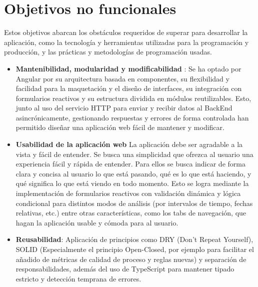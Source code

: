 \section{Objetivos no funcionales}

Estos objetivos abarcan los obstáculos requeridos de superar para desarrollar la aplicación, como la tecnología y herramientas utilizadas para la programación y producción, y las prácticas y metodologías de programación usadas.

\begin{itemize}
  \item \textbf{Mantenibilidad, modularidad y modificabilidad }: Se ha optado por Angular por su arquitectura basada en componentes, su flexibilidad y facilidad para la maquetación y el diseño de interfaces, su integración con formularios reactivos y su estructura dividida en módulos reutilizables. Esto, junto al uso del servicio HTTP para enviar y recibir datos al BackEnd asincrónicamente, gestionando respuestas y errores de forma controlada han permitido diseñar una aplicación web fácil de mantener y modificar.
  
  \item \textbf{Usabilidad de la aplicación web} La aplicación debe ser agradable a la vista y fácil de entender. Se busca una simplicidad que ofrezca al usuario una experiencia fácil y rápida de entender. Para ellos se busca indicar de forma clara y concisa al usuario lo que está pasando, qué es lo que está haciendo, y qué significa lo que está viendo en todo momento. Esto se logra mediante la implementación de formularios reactivos con validación dinámica y lógica condicional para distintos modos de análisis (por intervalos de tiempo, fechas relativas, etc.) entre otras características, como los tabs de navegación, que hagan la aplicación usable y cómoda para al usuario.

  \item \textbf{Reusabilidad}: Aplicación de principios como DRY (Don't Repeat Yourself), SOLID (Especialmente el principio Open-Closed, por ejemplo para facilitar el añadido de métricas de calidad de proceso y reglas nuevas) y separación de responsabilidades, además del uso de TypeScript para mantener tipado estricto y detección temprana de errores.


\end{itemize}